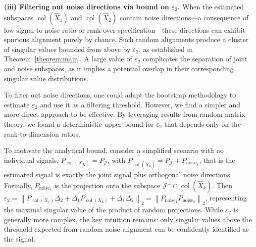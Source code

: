 \documentclass{amsart}
\DeclareMathOperator*{\col}{col}
\newcommand{\Jcal}{\mathcal{J}}
\begin{document}


\textbf{(iii) Filtering out noise directions via bound on $\varepsilon_2$.} When the estimated subspaces $\col(\widehat{X}_1)$ and $\col(\widehat{X}_2)$ contain noise directions—a consequence of low signal-to-noise ratio or rank over-specification—these directions can exhibit spurious alignment purely by chance. {Such random alignments produce a cluster of singular values bounded from above by $\varepsilon_2$, as established in Theorem~\ref{theorem:main}. A large value of $\varepsilon_2$ complicates the separation of joint and noise subspaces, as it implies a potential overlap in their corresponding singular value distributions.}

To filter out noise directions, one could adapt the bootstrap methodology to estimate $\varepsilon_2$ and use it as a filtering threshold. However, we find a simpler and more direct approach to be effective. By leveraging results from random matrix theory, we found a deterministic upper bound for $\varepsilon_2$ { that depends only on the rank-to-dimension ratios. }%


To motivate the analytical bound, consider a simplified scenario with no individual signals,  $P_{\col(X_K)}=P_{\Jcal}$, with $P_{\col(\widehat X_k)} = P_{\Jcal} + P_{\text{noise}_k}$, that is the estimated signal is exactly the joint signal plus orthogonal noise directions. {Formally, $P_{\text{noise}_k}$ is the projection onto the subspace $\Jcal^\perp \cap \col(\widehat X_k)$.} Then $
\varepsilon_2 = \left\|P_{{\col (X_1)}}\Delta_2 + \Delta_1P_{{\col (X_2)}}+\Delta_1\Delta_2\right\|_2 = \left\|P_{\text{noise}_1}P_{\text{noise}_2}\right\|_2$, representing the maximal singular value of the product of random projections. While $\varepsilon_2$ is generally more complex, the key intuition remains: only singular values above the threshold expected from random noise alignment can be confidently identified as the signal. 
\end{document}
